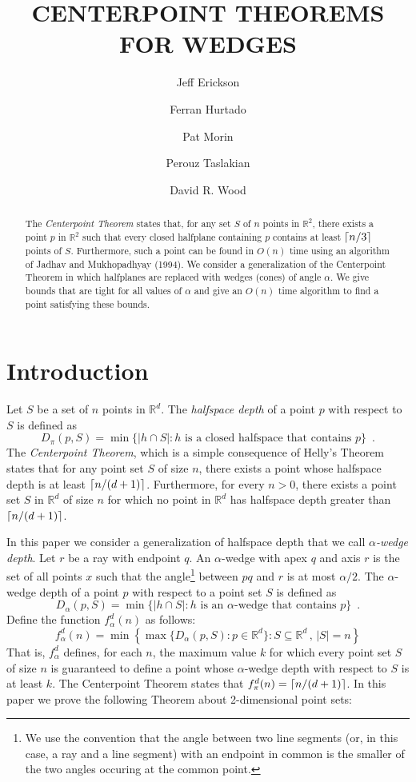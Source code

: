 \documentclass[lotsofwhite]{patmorin}
\title{\MakeUppercase{Centerpoint Theorems for Wedges}}
\author{Jeff Erickson \and
	Ferran Hurtado \and
	Pat Morin \and
	Perouz Taslakian \and
	David R. Wood}
\date{}
\begin{document}
\maketitle

\begin{abstract}
The \emph{Centerpoint Theorem} states that, for any set $S$ of $n$
points in $\mathbb{R}^2$, there exists a point $p$ in $\mathbb{R}^2$
such that every closed halfplane containing $p$ contains at least
$\left\lceil n/3 \right\rceil$ points of $S$. Furthermore, such a point can be found in
$O(n)$ time using an algorithm of Jadhav and Mukhopadhyay (1994).  We
consider a generalization of the Centerpoint Theorem in which
halfplanes are replaced with wedges (cones) of angle $\alpha$.  We
give bounds that are tight for all values of $\alpha$ and give an
$O(n)$ time algorithm to find a point satisfying these bounds.
\end{abstract}

\section{Introduction}

Let $S$ be a set of $n$ points in $\mathbb{R}^d$.  The \emph{halfspace
depth} \cite{t75} of a point $p$ with respect to $S$ is defined as
\[
D_\pi(p,S) = 
   \min\{|h\cap S| : \mbox{$h$ is a closed halfspace that contains $p$} \}
    \enspace .
\]
The \emph{Centerpoint Theorem}, which is a simple consequence of
Helly's Theorem \cite{e93} states that for any point set $S$ of size
$n$, there exists a point whose halfspace depth is at least
$\left\lceil n/(d+1) \right\rceil$.  Furthermore, for every $n>0$, there exists a point
set $S$ in $\mathbb{R}^d$ of size $n$ for which no point in
$\mathbb{R}^d$ has halfspace depth greater than $\left\lceil n/(d+1) \right\rceil$. 

In this paper we consider a generalization of halfspace depth that we
call \emph{$\alpha$-wedge depth}. Let $r$ be a ray with endpoint $q$.
An $\alpha$-wedge with apex $q$ and axis $r$ is the set of all points
$x$ such that the angle\footnote{We use the convention that the angle
between two line segments (or, in this case, a ray and a line segment)
with an endpoint in common is the smaller of the two angles occuring
at the common point.} between $pq$ and $r$ is at most $\alpha/2$.  The
$\alpha$-wedge depth of a point $p$ with respect to a point set $S$ is
defined as
\[
D_\alpha(p,S) =
   \min\{|h\cap S| : \mbox{$h$ is an $\alpha$-wedge that contains $p$} \} 
   \enspace .
\]
Define the function $f^d_\alpha(n)$ as follows:
\[
   f^d_\alpha(n) = \min\left\{\max\{D_\alpha(p,S):p\in
\mathbb{R}^d\}: S\subseteq\mathbb{R}^d\, ,\, |S|=n\right\}
\]
That is, $f^d_\alpha$ defines, for each $n$, the maximum value $k$ for
which every point set $S$ of size $n$ is guaranteed to define a point
whose $\alpha$-wedge depth with respect to $S$ is at least $k$.  The
Centerpoint Theorem states that $f^d_\pi(n) = \left\lceil n/(d+1) \right\rceil$.  In this paper
we prove the following Theorem about 2-dimensional point sets:
\end{document}
